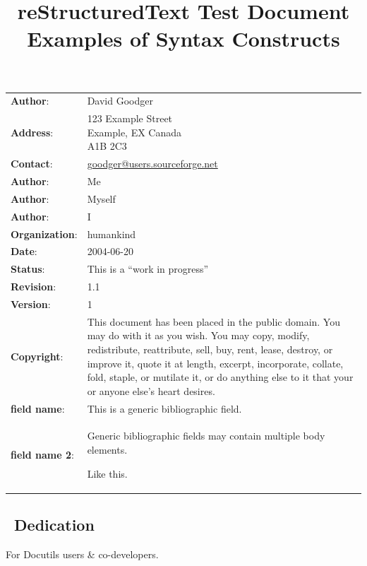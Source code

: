 \documentclass[10pt,a4paper,english]{article}
\title{reStructuredText Test Document\\
\large{Examples of Syntax Constructs}
}
\author{}
\date{}
\newlength{\docinfowidth}
\newlength{\locallinewidth}
\begin{document}
\maketitle

\begin{center}
\begin{tabularx}{\docinfowidth}{lX}
\textbf{Author}: &
	David Goodger \\
\textbf{Address}: &
	{\raggedright
123 Example Street~\\
Example, EX  Canada~\\
A1B 2C3 } \\
\textbf{Contact}: &
	\href{mailto:goodger@users.sourceforge.net}{goodger@users.sourceforge.net} \\
\textbf{Author}: &
	Me \\
\textbf{Author}: &
	Myself \\
\textbf{Author}: &
	I \\
\textbf{Organization}: &
	humankind \\
\textbf{Date}: &
	2004-06-20 \\
\textbf{Status}: &
	This is a ``work in progress'' \\
\textbf{Revision}: &
	1.1 \\
\textbf{Version}: &
	1 \\
\textbf{Copyright}: &
	This document has been placed in the public domain. You
may do with it as you wish. You may copy, modify,
redistribute, reattribute, sell, buy, rent, lease,
destroy, or improve it, quote it at length, excerpt,
incorporate, collate, fold, staple, or mutilate it, or do
anything else to it that your or anyone else's heart
desires. \\
\textbf{field name}: &
	This is a generic bibliographic field. \\
\textbf{field name 2}: &
	Generic bibliographic fields may contain multiple body elements.

Like this. \\
\end{tabularx}
\end{center}

\setlength{\locallinewidth}{\linewidth}


\subsection*{~\hfill Dedication\hfill ~}

For Docutils users {\&} co-developers.
\end{document}
